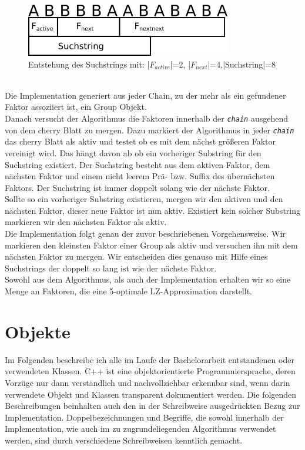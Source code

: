 \begin{figure}[h]
	\includegraphics[width=0.8\textwidth]{Suchstring}
	\centering
		\caption{Entstehung des Suchstrings mit: |$F_{active}$|=2, |$F_{next}$|=4,|Suchstring|=8}
\end{figure}
\\
Die Implementation generiert aus jeder Chain, zu der mehr als ein gefundener Faktor assoziiert ist, ein Group Objekt.\\
Danach versucht der Algorithmus die Faktoren innerhalb der \textit{\texttt{chain}}  ausgehend von dem cherry Blatt zu mergen. Dazu markiert der Algorithmus in jeder \textit{\texttt{chain}}  das cherry Blatt als aktiv und testet ob es mit dem nächst größeren Faktor vereinigt wird. Das hängt davon ab ob ein vorheriger Substring für den Suchstring existiert. Der Suchstring besteht aus dem aktiven Faktor, dem nächsten Faktor und einem nicht leerem Prä- bzw. Suffix des übernächsten Faktors. Der Suchstring ist immer doppelt solang wie der nächste Faktor.\\ 
Sollte so ein vorheriger Substring existieren, mergen wir den aktiven und den nächsten Faktor, dieser neue Faktor ist nun aktiv. Existiert kein solcher Substring markieren wir den nächsten Faktor als aktiv.\\
Die Implementation folgt genau der zuvor beschriebenen Vorgehensweise. Wir markieren den kleinsten Faktor einer Group als aktiv und versuchen ihn mit dem nächsten Faktor zu mergen. Wir entscheiden dies genauso mit Hilfe eines Suchstrings der doppelt so lang ist wie der nächste Faktor.\\
Sowohl aus dem Algorithmus, als auch der Implementation erhalten wir so eine Menge an Faktoren, die eine 5-optimale LZ-Approximation darstellt.


\section{Objekte}
Im Folgenden beschreibe ich alle im Laufe der Bachelorarbeit entstandenen oder verwendeten Klassen.
C++ ist eine objektorientierte Programmiersprache, deren Vorzüge nur 
dann verständlich und nachvollziehbar erkennbar sind, wenn darin 
verwendete Objekt und Klassen  transparent dokumentiert werden. Die 
folgenden Beschreibungen beinhalten auch den in der Schreibweise 
ausgedrückten Bezug zur Implementation. Doppelbezeichnungen und 
Begriffe, die sowohl innerhalb der Implementation, wie auch im zu 
zugrundeliegenden Algorithmus verwendet werden, sind durch verschiedene 
Schreibweisen kenntlich gemacht.

